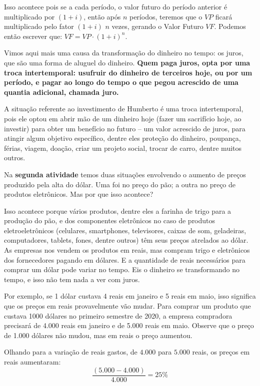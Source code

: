 Isso acontece pois se a cada período, o valor futuro do período anterior é multiplicado por $(1+i)$, então após $n$ períodos, teremos que o $\mathit{VP}$  ficará multiplicado pelo fator $(1+i)$ $n$ vezes, gerando o Valor Futuro $\mathit{VF}$. Podemos então escrever que: $\mathit{VF}=\mathit{VP}\cdot(1+i)^n$. 

Vimos aqui mais uma causa da transformação do dinheiro no tempo: os juros, que são uma forma de aluguel do dinheiro. \textbf{Quem paga juros, opta por uma troca intertemporal: usufruir do dinheiro de terceiros hoje, ou por um período, e pagar ao longo do tempo o que pegou acrescido de uma quantia adicional, chamada juro.}

A situação referente ao investimento de Humberto é uma troca intertemporal, pois ele optou em abrir mão de um dinheiro hoje (fazer um sacrifício hoje, ao investir) para obter um benefício no futuro – um valor acrescido de juros, para atingir algum objetivo específico, dentre eles proteção do dinheiro, poupança, férias, viagem, doação, criar um projeto social, trocar de carro, dentre muitos outros. 

Na \textbf{segunda atividade} temos duas situações envolvendo o aumento de preços produzido pela alta do dólar. Uma foi no preço do pão; a outra no preço de produtos eletrônicos. Mas por que isso acontece?

Isso acontece porque vários produtos, dentre eles a farinha de trigo para a produção do pão, e dos componentes eletrônicos no caso de produtos eletroeletrônicos (celulares, smartphones, televisores, caixas de som, geladeiras, computadores, tablets, fones, dentre outros) têm seus preços atrelados ao dólar. As empresas nos vendem os produtos em reais, mas compram trigo e eletrônicos dos fornecedores pagando em dólares. E a quantidade de reais necessários para comprar um dólar pode variar no tempo. Eis o dinheiro se transformando no tempo, e isso não tem nada a ver com juros.

Por exemplo, se 1 dólar custava 4 reais em janeiro e 5 reais em maio, isso significa que os preços em reais provavelmente vão mudar. Para comprar um produto que custava 1000 dólares no primeiro semestre de 2020, a empresa compradora precisará de 4.000 reais em janeiro e de 5.000 reais em maio. Observe que o preço de 1.000 dólares não mudou, mas em reais o preço aumentou.

Olhando para a variação de reais gastos, de $4.000$ para $5.000$ reais, os preços em reais aumentaram:
\begin{equation*}
\frac{(5.000-4.000)}{4.000}=25\%
\end{equation*}

